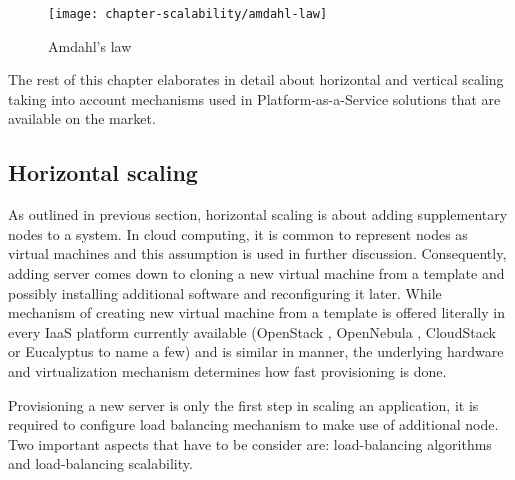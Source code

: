 \begin{figure}[!ht]
  \begin{center}
    \texttt{[image: chapter-scalability/amdahl-law]}
  \end{center}
  \caption{Amdahl's law}
  \label{fig:amdahl-law}
\end{figure}

The rest of this chapter elaborates in detail about horizontal and vertical scaling taking into account mechanisms used in Platform-as-a-Service solutions that are available on the market.

\subsection{Horizontal scaling}
As outlined in previous section, horizontal scaling is about adding supplementary nodes to a system. In cloud computing, it is common to represent nodes as virtual machines and this assumption is used in further discussion. Consequently, adding server comes down to cloning a new virtual machine from a template and possibly installing additional software and reconfiguring it later. While mechanism of creating new virtual machine from a template is offered literally in every IaaS platform currently available (OpenStack \cite{OpenStack}, OpenNebula \cite{OpenNebula}, CloudStack \cite{CloudStack} or Eucalyptus \cite{Eucalyptus} to name a few) and is similar in manner, the underlying hardware and virtualization mechanism determines how fast provisioning is done. 

Provisioning a new server is only the first step in scaling an application, it is required to configure load balancing mechanism to make use of additional node. Two important aspects that have to be consider are: load-balancing algorithms and load-balancing scalability.

